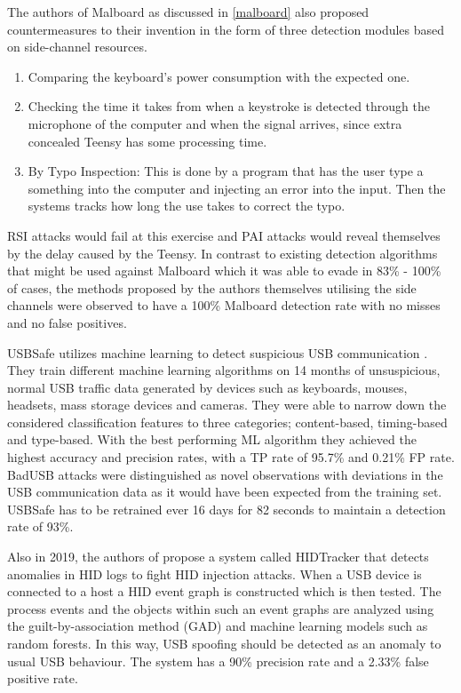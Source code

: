The authors of Malboard \cite{farhiMalboardNovelUser2019} as discussed in \ref{malboard} also proposed countermeasures to their invention in the form of three detection modules based on side-channel resources. 
\begin{enumerate}
    \item Comparing the keyboard's power consumption with the expected one.
    \item Checking the time it takes from when a keystroke is detected through the microphone of the computer and when the signal arrives, since extra  concealed Teensy has some processing time.
    \item By Typo Inspection: This is done by a program that has the user type a something into the computer and injecting an error into the input. Then the systems tracks how long the use takes to correct the typo.
\end{enumerate}
RSI attacks would fail at this exercise and PAI attacks would reveal themselves by the delay caused by the Teensy.   
In contrast to existing detection algorithms that might be used against Malboard which it was able to evade in 83\% - 100\% of cases, the methods proposed by the authors themselves utilising the side channels were observed to have a 100\% Malboard detection rate with no misses and no false positives.  

USBSafe utilizes machine learning to detect suspicious USB communication \cite{kharrazUSBESAFEEndPointSolution2019}. They train different machine learning algorithms on 14 months of unsuspicious, normal USB traffic data generated by devices such as keyboards, mouses, headsets, mass storage devices and cameras. They were able to narrow down the considered classification features to three categories; content-based, timing-based and type-based. With the best performing ML algorithm they achieved the highest accuracy and precision rates, with a TP rate of 95.7\% and 0.21\% FP rate. BadUSB attacks were distinguished as novel observations with deviations in the USB communication data as it would have been expected from the training set. 
USBSafe has to be retrained ever 16 days for 82 seconds to maintain a detection rate of 93\%.

Also in 2019, the authors of \cite{IdentifyingHIDbasedAttacks2019} propose a system called HIDTracker that detects anomalies in HID logs to fight HID injection attacks. When a USB device is connected to a host a HID event graph is constructed which is then tested. The process events and the objects within such an event graphs are analyzed using the guilt-by-association method (GAD) and machine learning models such as random forests. In this way, USB spoofing should be detected as an anomaly to usual USB behaviour. The system has a 90\% precision rate and a 2.33\% false positive rate. 

